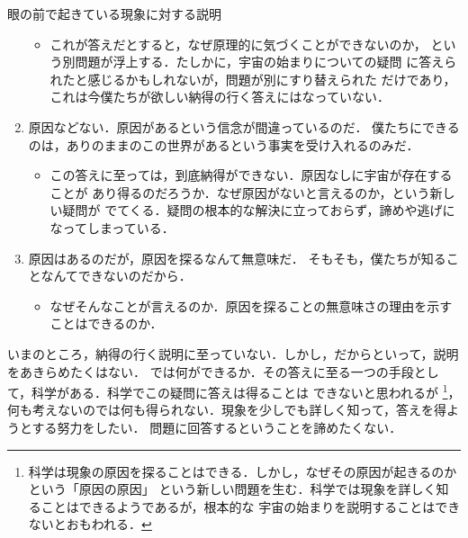 \begin{memo}{眼の前で起きている現象に対する説明}
\begin{enumerate}
                    \begin{itemize}
                        \item これが答えだとすると，なぜ原理的に気づくことができないのか，
                              という別問題が浮上する．たしかに，宇宙の始まりについての疑問
                              に答えられたと感じるかもしれないが，問題が別にすり替えられた
                              だけであり，これは今僕たちが欲しい納得の行く答えにはなっていない．
                    \end{itemize}
                \item 原因などない．原因があるという信念が間違っているのだ．
                      僕たちにできるのは，ありのままのこの世界があるという事実を受け入れるのみだ．
                    \begin{itemize}
                        \item この答えに至っては，到底納得ができない．原因なしに宇宙が存在することが
                              あり得るのだろうか．なぜ原因がないと言えるのか，という新しい疑問が
                              でてくる．疑問の根本的な解決に立っておらず，諦めや逃げになってしまっている．
                    \end{itemize}
                \item 原因はあるのだが，原因を探るなんて無意味だ．
                      そもそも，僕たちが知ることなんてできないのだから．
                    \begin{itemize}
                        \item なぜそんなことが言えるのか．原因を探ることの無意味さの理由を示すことはできるのか．
                    \end{itemize}
                \end{enumerate}
        \end{memo}
        
        いまのところ，納得の行く説明に至っていない．しかし，だからといって，説明をあきらめたくはない．
        では何ができるか．その答えに至る一つの手段として，科学がある．科学でこの疑問に答えは得ることは
        できないと思われるが
            \footnote{
                科学は現象の原因を探ることはできる．しかし，なぜその原因が起きるのかという「原因の原因」
                という新しい問題を生む．科学では現象を詳しく知ることはできるようであるが，根本的な
                宇宙の始まりを説明することはできないとおもわれる．
            }，
        何も考えないのでは何も得られない．現象を少しでも詳しく知って，答えを得ようとする努力をしたい．
        問題に回答するということを諦めたくない．

